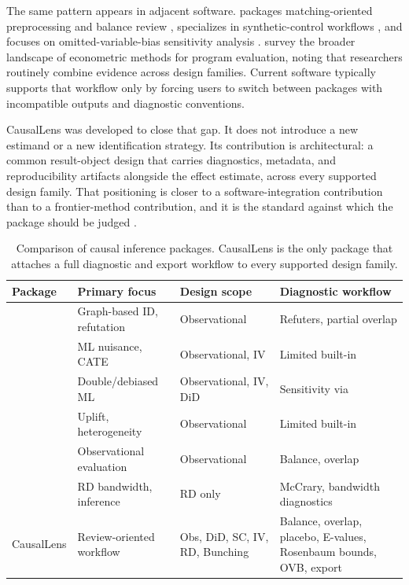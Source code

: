 \documentclass[article]{jss}
\begin{document}
The same pattern appears in adjacent  software. 
packages matching-oriented preprocessing and balance review
\citep{HoImaiKingStuart2011},  specializes in
synthetic-control workflows \citep{AbadieDiamondHainmueller2011}, and
 focuses on omitted-variable-bias sensitivity analysis
\citep{CinelliFerwerdaHazlett2020}. \citet{AbadieCattaneo2018} survey the
broader landscape of econometric methods for program evaluation, noting
that researchers routinely combine evidence across design families. Current
software typically supports that workflow only by forcing users to switch
between packages with incompatible outputs and diagnostic conventions.

CausalLens was developed to close that gap. It does not introduce a new
estimand or a new identification strategy. Its contribution is architectural:
a common result-object design that carries diagnostics, metadata, and
reproducibility artifacts alongside the effect estimate, across every
supported design family. That positioning is closer to a software-integration
contribution than to a frontier-method contribution, and it is the standard
against which the package should be judged
\citep{ImbensLemieux2008,LeeLemieux2010,AngristPischke2009,BachEtAl2022,CalonicoEtAl2015}.

\begin{table}[t!]
\centering
\footnotesize
\setlength{\tabcolsep}{4.5pt}
\begin{tabular}{L{2.4cm}L{3.2cm}L{3.2cm}L{4.2cm}}
\hline
Package & Primary focus & Design scope & Diagnostic workflow \\
\hline
{} & Graph-based ID, refutation & Observational & Refuters, partial overlap \\
 & ML nuisance, CATE & Observational, IV & Limited built-in \\
 & Double/debiased ML & Observational, IV, DiD & Sensitivity via  \\
 & Uplift, heterogeneity & Observational & Limited built-in \\
 & Observational evaluation & Observational & Balance, overlap \\
 & RD bandwidth, inference & RD only & McCrary, bandwidth diagnostics \\
CausalLens & Review-oriented workflow & Obs, DiD, SC, IV, RD, Bunching & Balance, overlap, placebo, E-values, Rosenbaum bounds, OVB, export \\
\hline
\end{tabular}
\caption{\label{tab:comparison} Comparison of  causal
inference packages. CausalLens is the only package that attaches a full
diagnostic and export workflow to every supported design family.}
\end{table}
\end{document}
